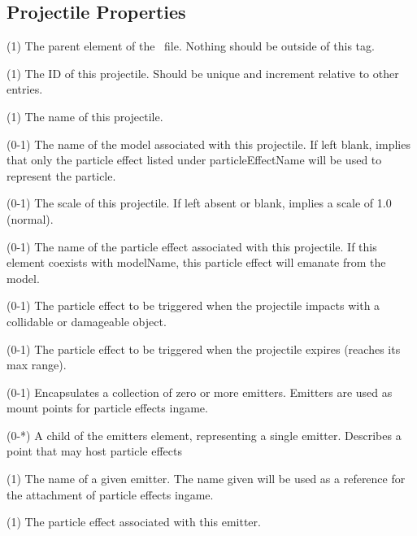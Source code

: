 \subsection{Projectile Properties}

\begin{description}
\item {} (1)  The parent element of the \ProjProps\ file.  Nothing should be outside of this tag.
\item {} (1)  The ID of this projectile.  Should be unique and increment relative to other entries.
\item {} (1) The name of this projectile.
\item {} (0-1)  The name of the model associated with this projectile.  If left blank, implies that only the particle effect listed under particleEffectName will be used to represent the particle. 
\item {} (0-1)  The scale of this projectile.  If left absent or blank, implies a scale of 1.0 (normal).
\item {} (0-1)  The name of the particle effect associated with this projectile.  If this element coexists with modelName, this particle effect will emanate from the model.
\item {} (0-1)  The particle effect to be triggered when the projectile impacts with a collidable or damageable object.
\item {} (0-1)  The particle effect to be triggered when the projectile expires (reaches its max range).

\item {} (0-1) Encapsulates a collection of zero or more emitters.  Emitters are used as mount points for particle effects ingame.
\item {} (0-*)  A child of the emitters element, representing a single emitter.  Describes a point that may host particle effects 
\item {} (1) The name of a given emitter.  The name given will be used as a reference for the attachment of particle effects ingame.
\item {} (1)  The particle effect associated with this emitter.


\end{description}
